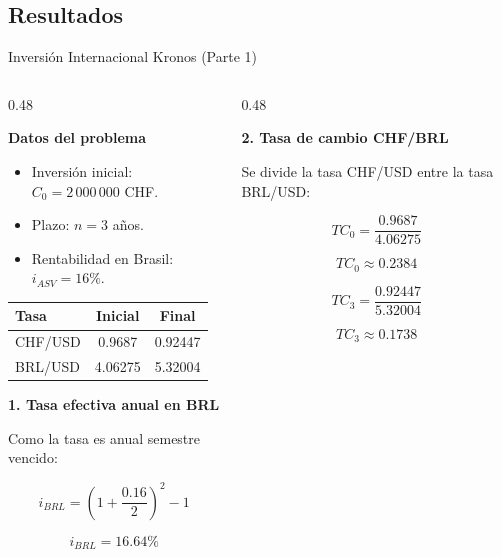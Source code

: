 \documentclass[10pt]{beamer}
\begin{document}
\subsection{Resultados}

\begin{frame}{Inversión Internacional Kronos (Parte 1)}

\small

\begin{columns}[T,onlytextwidth]

\begin{column}{0.48\textwidth}

\textbf{Datos del problema}

\begin{itemize}
    \item Inversión inicial: \(C_0=2\,000\,000\) CHF.
    \item Plazo: \(n=3\) años.
    \item Rentabilidad en Brasil: \(i_{ASV}=16\%\).
\end{itemize}


\begin{table}
\centering
\footnotesize
\begin{tabular}{lcc}
\hline
\textbf{Tasa} & \textbf{Inicial} & \textbf{Final}\\
\hline
CHF/USD & 0.9687 & 0.92447\\
BRL/USD & 4.06275 & 5.32004\\
\hline
\end{tabular}
\end{table}

\textbf{1. Tasa efectiva anual en BRL}

Como la tasa es anual semestre vencido:

\[
i_{BRL}=
\left(1+\frac{0.16}{2}\right)^2-1
\]

\[
\boxed{i_{BRL}=16.64\%}
\]

\end{column}

\begin{column}{0.48\textwidth}

\textbf{2. Tasa de cambio CHF/BRL}

Se divide la tasa CHF/USD entre la tasa BRL/USD:

\[
TC_0=\frac{0.9687}{4.06275}
\]

\[
TC_0\approx 0.2384
\]

\vspace{-0.2cm}

\[
TC_3=\frac{0.92447}{5.32004}
\]

\[
TC_3\approx 0.1738
\]

\end{column}

\end{columns}

\end{frame}
\end{document}
